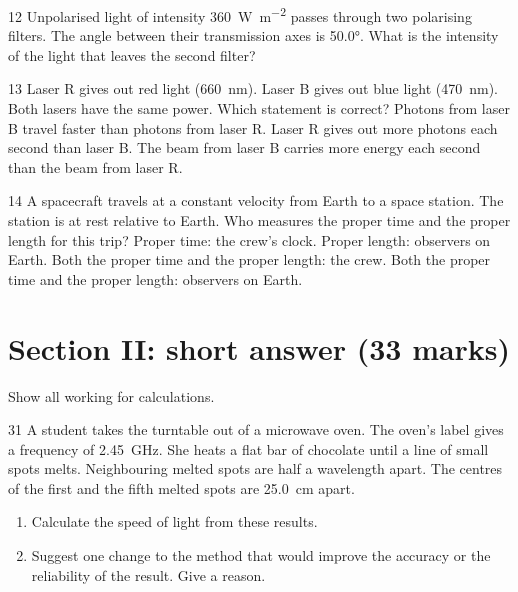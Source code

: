 \begin{practiceq}{1}{2}\label{pq:twofilters}
Unpolarised light of intensity \qty{360}{W.m^{-2}} passes through two polarising filters. The
angle between their transmission axes is \ang{50.0}. What is the intensity of the light that
leaves the second filter?
\end{practiceq}

\begin{practiceq}{1}{3}\label{pq:lasers}
Laser R gives out red light (\qty{660}{nm}). Laser B gives out blue light (\qty{470}{nm}). Both
lasers have the same power. Which statement is correct?
  {Photons from laser B travel faster than photons from laser R.}
  {Laser R gives out more photons each second than laser B.}
  {The beam from laser B carries more energy each second than the beam from laser R.}
\end{practiceq}

\begin{practiceq}{1}{4}\label{pq:proper}
A spacecraft travels at a constant velocity from Earth to a space station. The station is at
rest relative to Earth. Who measures the proper time and the proper length for this trip?
  {Proper time: the crew's clock. \quad Proper length: observers on Earth.}
  {Both the proper time and the proper length: the crew.}
  {Both the proper time and the proper length: observers on Earth.}
\end{practiceq}

\section*{Section II: short answer (33 marks)}
Show all working for calculations.

\begin{practiceq}{3}{1}\label{pq:microwave}
A student takes the turntable out of a microwave oven. The oven's label gives a frequency of
\qty{2.45}{GHz}. She heats a flat bar of chocolate until a line of small spots melts.
Neighbouring melted spots are half a wavelength apart. The centres of the first and the fifth
melted spots are \qty{25.0}{cm} apart.
\begin{enumerate}[label=(\alph*)]
  \item Calculate the speed of light from these results. 
  \item Suggest one change to the method that would improve the accuracy or the reliability of
        the result. Give a reason. 
\end{enumerate}
\end{practiceq}

